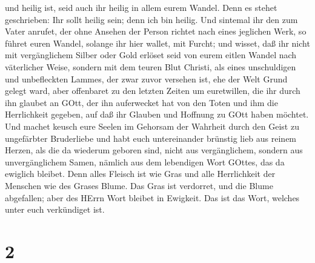 und heilig ist, seid auch ihr heilig in allem eurem Wandel.
 Denn es stehet geschrieben: Ihr sollt heilig sein; denn
ich bin heilig.  Und sintemal ihr den zum Vater anrufet,
der ohne Ansehen der Person richtet nach eines jeglichen Werk, so führet
euren Wandel, solange ihr hier wallet, mit Furcht;  und
wisset, daß ihr nicht mit vergänglichem Silber oder Gold erlöset seid
von eurem eitlen Wandel nach väterlicher Weise,  sondern
mit dem teuren Blut Christi, als eines unschuldigen und unbefleckten
Lammes,  der zwar zuvor versehen ist, ehe der Welt Grund
gelegt ward, aber offenbaret zu den letzten Zeiten um euretwillen,
 die ihr durch ihn glaubet an GOtt, der ihn auferwecket hat
von den Toten und ihm die Herrlichkeit gegeben, auf daß ihr Glauben und
Hoffnung zu GOtt haben möchtet.  Und machet keusch eure
Seelen im Gehorsam der Wahrheit durch den Geist zu ungefärbter
Bruderliebe und habt euch untereinander brünstig lieb aus reinem Herzen,
 als die da wiederum geboren sind, nicht aus vergänglichem,
sondern aus unvergänglichem Samen, nämlich aus dem lebendigen Wort
GOttes, das da ewiglich bleibet.  Denn alles Fleisch ist
wie Gras und alle Herrlichkeit der Menschen wie des Grases Blume. Das
Gras ist verdorret, und die Blume abgefallen;  aber des
HErrn Wort bleibet in Ewigkeit. Das ist das Wort, welches unter euch
verkündiget ist.

\hypertarget{section-1}{%
\section{2}\label{section-1}}

